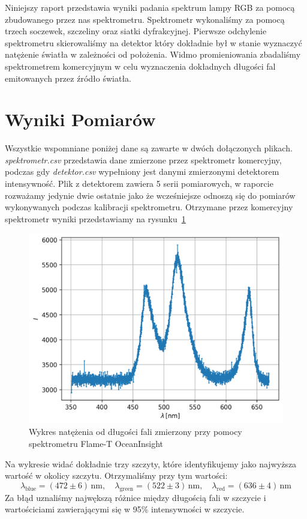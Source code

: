 \documentclass[12pt]{article}
\title{}
\author{Kacper Kłos}
\begin{document}
\maketitle

Niniejszy raport przedstawia wyniki padania spektrum lampy RGB za pomocą zbudowanego przez nas spektrometru. Spektrometr wykonaliśmy za pomocą trzech soczewek, szczeliny oraz siatki dyfrakcyjnej. Pierwsze odchylenie spektrometru skierowaliśmy na detektor który dokładnie był w stanie wyznaczyć natężenie światła w zależności od położenia. Widmo promieniowania zbadaliśmy spektrometrem komercyjnym w celu wyznaczenia dokładnych długości fal emitowanych przez źródło światła.

\newpage
\section{Wyniki Pomiarów}
Wszystkie wspomniane poniżej dane są zawarte w dwóch dołączonych plikach. \textit{spektrometr.csv} przedstawia dane zmierzone przez spektrometr komercyjny, podczas gdy \textit{detektor.csv} wypełniony jest danymi zmierzonymi detektorem intensywność. Plik z detektorem zawiera 5 serii pomiarowych, w raporcie rozważamy jedynie dwie ostatnie jako że wcześniejsze odnoszą się do pomiarów wykonywanych podczas kalibracji spektrometru.
Otrzymane przez komercyjny spektrometr wyniki przedstawiamy na rysunku~\ref{fig:spektrometr}
 \begin{figure}[H]
     \centering
     \includegraphics[scale=0.7]{spektrum}
     \caption{Wykres natężenia od długości fali zmierzony przy pomocy spektrometru Flame-T OceanInsight}
     \label{fig:spektrometr}
\end{figure}
Na wykresie widać dokładnie trzy szczyty, które identyfikujemy jako najwyższa wartość w okolicy szczytu. Otrzymaliśmy przy tym wartości:
\[
    \lambda_{\mathrm{blue}} = (472 \pm 6) \, \mathrm{nm}, \quad \lambda_{\mathrm{green}} = (522 \pm 3) \, \mathrm{nm}, \quad \lambda_{\mathrm{red}} = (636 \pm 4) \, \mathrm{nm}
\]
Za błąd uznaliśmy najwększą różnice między długością fali w szczycie i wartościciami zawierającymi się w 95\% intensywności w szczycie.
\end{document}
